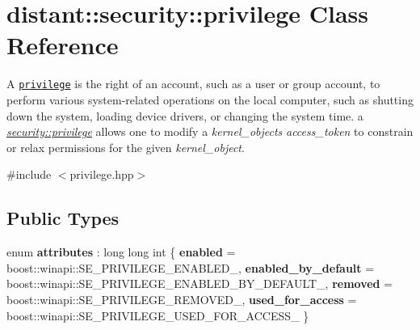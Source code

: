\hypertarget{classdistant_1_1security_1_1privilege}{}\section{distant\+:\+:security\+:\+:privilege Class Reference}
\label{classdistant_1_1security_1_1privilege}


A \href{https://msdn.microsoft.com/en-us/library/windows/desktop/aa379306(v=vs.85).aspx}{\tt privilege} is the right of an account, such as a user or group account, to perform various system-\/related operations on the local computer, such as shutting down the system, loading device drivers, or changing the system time. a {\itshape \mbox{\hyperlink{classdistant_1_1security_1_1privilege}{security\+::privilege}}} allows one to modify a {\itshape kernel\+\_\+object\textquotesingle{}s} {\itshape access\+\_\+token} to constrain or relax permissions for the given {\itshape kernel\+\_\+object}.  




{\ttfamily \#include $<$privilege.\+hpp$>$}

\subsection*{Public Types}
\begin{DoxyCompactItemize}
\item 
\mbox{\label{classdistant_1_1security_1_1privilege_a9bdb7bb426e514d33a216ba90cff72fc}} 
enum {\bfseries attributes} \+: long long int \{ {\bfseries enabled} = boost\+:\+:winapi\+:\+:S\+E\+\_\+\+P\+R\+I\+V\+I\+L\+E\+G\+E\+\_\+\+E\+N\+A\+B\+L\+E\+D\+\_\+, 
{\bfseries enabled\+\_\+by\+\_\+default} = boost\+:\+:winapi\+:\+:S\+E\+\_\+\+P\+R\+I\+V\+I\+L\+E\+G\+E\+\_\+\+E\+N\+A\+B\+L\+E\+D\+\_\+\+B\+Y\+\_\+\+D\+E\+F\+A\+U\+L\+T\+\_\+, 
{\bfseries removed} = boost\+:\+:winapi\+:\+:S\+E\+\_\+\+P\+R\+I\+V\+I\+L\+E\+G\+E\+\_\+\+R\+E\+M\+O\+V\+E\+D\+\_\+, 
{\bfseries used\+\_\+for\+\_\+access} = boost\+:\+:winapi\+:\+:S\+E\+\_\+\+P\+R\+I\+V\+I\+L\+E\+G\+E\+\_\+\+U\+S\+E\+D\+\_\+\+F\+O\+R\+\_\+\+A\+C\+C\+E\+S\+S\+\_\+
 \}
\end{DoxyCompactItemize}
